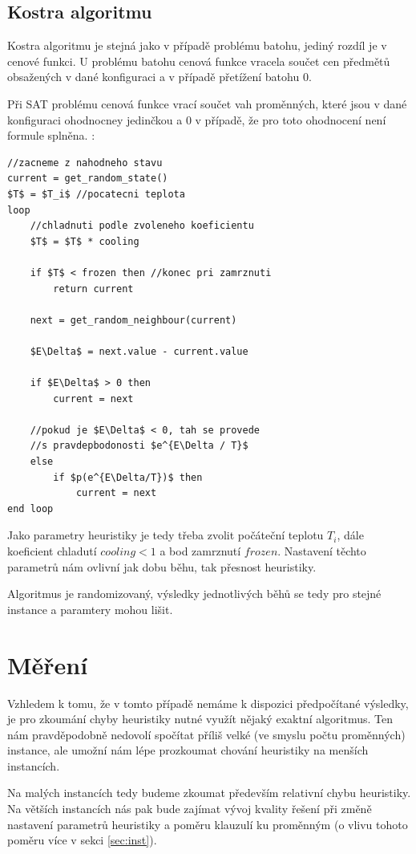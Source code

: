 \documentclass[11pt]{article}
\begin{document}
\subsection{Kostra algoritmu}
\label{sec:kostra}

Kostra algoritmu je stejná jako v případě problému batohu, jediný rozdíl je v cenové funkci. U problému batohu cenová funkce vracela součet cen předmětů obsažených v dané konfiguraci a v případě přetížení batohu 0. 

Při SAT problému cenová funkce vrací součet vah proměnných, které jsou v dané konfiguraci ohodnocney jedinčkou a 0 v případě, že pro toto ohodnocení není formule splněna.  \cite{aibook}:

\begin{lstlisting}[mathescape]
//zacneme z nahodneho stavu
current = get_random_state()
$T$ = $T_i$ //pocatecni teplota
loop
	//chladnuti podle zvoleneho koeficientu
	$T$ = $T$ * cooling

	if $T$ < frozen then //konec pri zamrznuti
		return current

	next = get_random_neighbour(current)
	
	$E\Delta$ = next.value - current.value

	if $E\Delta$ > 0 then
		current = next
	
	//pokud je $E\Delta$ < 0, tah se provede
	//s pravdepbodonosti $e^{E\Delta / T}$
	else
		if $p(e^{E\Delta/T})$ then
			current = next
end loop
\end{lstlisting}

Jako parametry heuristiky je tedy třeba zvolit počáteční teplotu $T_i$, dále koeficient chladutí $cooling < 1$ a bod zamrznutí $frozen$. Nastavení těchto parametrů nám ovlivní jak dobu běhu, tak přesnost heuristiky.

Algoritmus je randomizovaný, výsledky jednotlivých běhů se tedy pro stejné instance a paramtery mohou lišit.

\section{Měření}

Vzhledem k tomu, že v tomto případě nemáme k dispozici předpočítané výsledky, je pro zkoumání chyby heuristiky nutné využít nějaký exaktní algoritmus. Ten nám pravděpodobně nedovolí spočítat příliš velké (ve smyslu počtu proměnných) instance, ale umožní nám lépe prozkoumat chování heuristiky na menších instancích.

Na malých instancích tedy budeme zkoumat především relativní chybu heuristiky. Na větších instancích nás pak bude zajímat vývoj kvality řešení při změně nastavení parametrů heuristiky a poměru klauzulí ku proměnným (o vlivu tohoto poměru více v sekci \ref{sec:inst}). 
\end{document}
